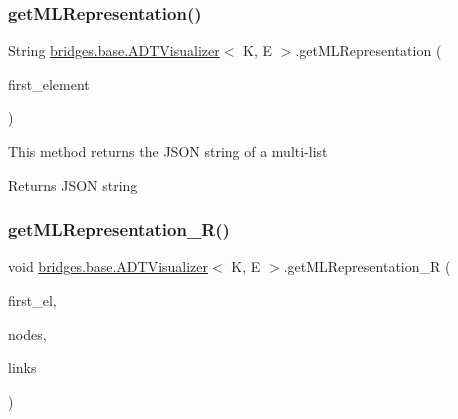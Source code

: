 \subsubsection{\texorpdfstring{get\+M\+L\+Representation()}{getMLRepresentation()}}
{\footnotesize\ttfamily String \hyperlink{classbridges_1_1base_1_1_a_d_t_visualizer}{bridges.\+base.\+A\+D\+T\+Visualizer}$<$ K, E $>$.get\+M\+L\+Representation (\begin{DoxyParamCaption}\item[{\hyperlink{classbridges_1_1base_1_1_m_lelement}{M\+Lelement}$<$ E $>$}]{first\+\_\+element }\end{DoxyParamCaption})}

This method returns the J\+S\+ON string of a multi-\/list

\begin{DoxyReturn}{Returns}
J\+S\+ON string 
\end{DoxyReturn}
\hypertarget{classbridges_1_1base_1_1_a_d_t_visualizer_a1619f140d9a1d46f83c0881f6380286b}{}\label{classbridges_1_1base_1_1_a_d_t_visualizer_a1619f140d9a1d46f83c0881f6380286b} 
\subsubsection{\texorpdfstring{get\+M\+L\+Representation\+\_\+\+R()}{getMLRepresentation\_R()}}
{\footnotesize\ttfamily void \hyperlink{classbridges_1_1base_1_1_a_d_t_visualizer}{bridges.\+base.\+A\+D\+T\+Visualizer}$<$ K, E $>$.get\+M\+L\+Representation\+\_\+R (\begin{DoxyParamCaption}\item[{\hyperlink{classbridges_1_1base_1_1_m_lelement}{M\+Lelement}$<$ E $>$}]{first\+\_\+el,  }\item[{Linked\+List$<$ \hyperlink{classbridges_1_1base_1_1_m_lelement}{M\+Lelement}$<$ E $>$$>$}]{nodes,  }\item[{Linked\+List$<$ \hyperlink{classbridges_1_1base_1_1_m_lelement}{M\+Lelement}$<$ E $>$$>$}]{links }\end{DoxyParamCaption})}

\hypertarget{classbridges_1_1base_1_1_a_d_t_visualizer_a8bfd44ca6eef7b19feb6061cb7e141ef}{}\label{classbridges_1_1base_1_1_a_d_t_visualizer_a8bfd44ca6eef7b19feb6061cb7e141ef} 
